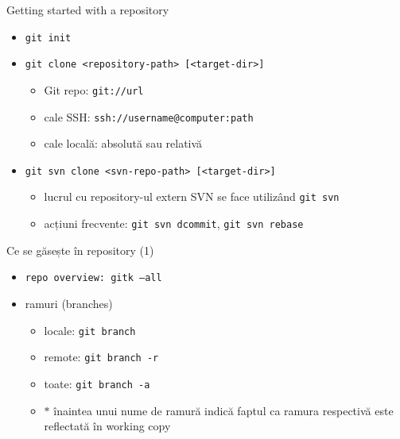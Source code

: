 \documentclass{beamer}
\begin{document}
\begin{frame}{Getting started with a repository}
\begin{itemize} %
\item \texttt{git init}
\pause\item \texttt{git clone <repository-path> [<target-dir>]}
\begin{itemize}
	\item Git repo: \texttt{git://url}
	\item cale SSH: \texttt{ssh://username@computer:path}
	\item cale locală: absolută sau relativă
\end{itemize}
\pause\item \texttt{git svn clone <svn-repo-path> [<target-dir>]}
\begin{itemize}
	\item lucrul cu repository-ul extern SVN se face utilizând \texttt{git svn}
	\item acțiuni frecvente: \texttt{git svn dcommit}, \texttt{git svn rebase}
\end{itemize}
\end{itemize}
\end{frame}

\begin{frame}{Ce se găsește în repository (1)}
\begin{itemize} %
\item \texttt{repo overview: gitk --all}
\\
\pause\item ramuri (branches)
\begin{itemize}
	\item locale: \texttt{git branch}
	\item remote: \texttt{git branch -r}
	\item toate: \texttt{git branch -a}
	\item $*$ înaintea unui nume de ramură indică faptul ca ramura respectivă este reflectată în working copy
\end{itemize}
\end{itemize}
\end{frame}
\end{document}
